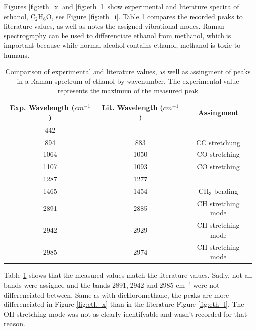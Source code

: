     Figures \ref{fig:eth_x} and \ref{fig:eth_l} show experimental and literature spectra of ethanol, C\(_2\)H\(_6\)O, see Figure \ref{fig:eth_i}.  Table \ref{table:eth} compares the recorded peaks to literature values, as well as notes the assigned vibrational modes. Raman spectrography can be used to differenciate ethanol from methanol, which is important because while normal alcohol contains ethanol, methanol is toxic to humans.

    \begin{table}[h]
    \begin{center}
        \vspace{15pt}
        \begin{tabular}{|c|c|c|}
         \hline
         Exp. Wavelength (\( cm^{-1} \) ) & Lit. Wavelength  (\( cm^{-1} \) ) & Assingment  \\ 
         \hline
         442 & - & - \\
         894 & 883 & CC stretchung \\ 
         1064 & 1050 & CO stretching\\
         1107 & 1093 & CO stretching\\
         1287 & 1277 & - \\
         1465 & 1454 & CH\(_3\) bending\\
         2891& 2885 &  CH stretching mode\\
         2942 & 2929 & CH stretching mode\\
         2985 & 2974 & CH stretching mode\\
         
         \hline
        \end{tabular}
        \caption{Comparison of experimental and literature \cite{ethl1} \cite{ethl2} values, as well as assingment of peaks in a Raman spectrum of ethanol by wavenumber. The experimental value represents the maximum of the measured peak }
        \label{table:eth}
    \end{center}
    \end{table}

    Table \ref{table:eth} shows that the measured values match the literature values. Sadly, not all bands were assigned and the bands 2891, 2942 and 2985 cm\(^{-1}\) were not differenciated between. Same as with dichloromethane, the peaks are more differenciated in Figure \ref{fig:eth_x} than in the literature Figure \ref{fig:eth_l}. The OH stretching mode was not as clearly identifyable and wasn't recorded for that reason.

